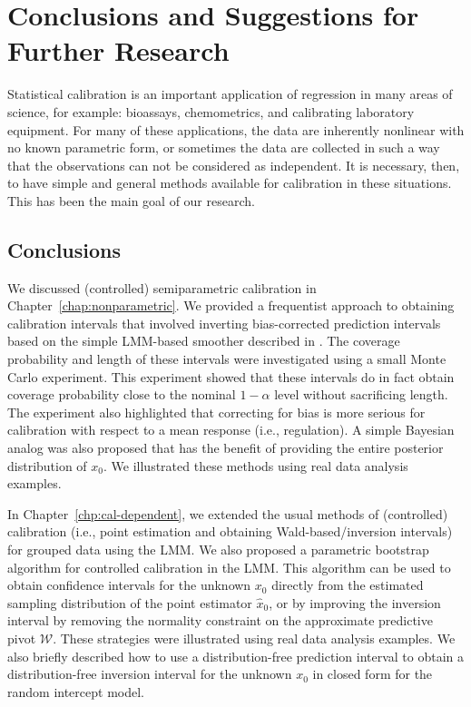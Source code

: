 \documentclass[cmfont,usenames,dvipsnames,leqno]{afit-etd}\usepackage[]{graphicx}\usepackage[]{color}
\begin{document}


\chapter{Conclusions and Suggestions for Further Research}
\label{chp:conclusion}
Statistical calibration is an important application of regression in many areas of science, for example: bioassays, chemometrics, and calibrating laboratory equipment. For many of these applications, the data are inherently nonlinear with no known parametric form, or sometimes the data are collected in such a way that the observations can not be considered as independent. It is necessary, then, to have simple and general methods available for calibration in these situations. This has been the main goal of our research.

\section{Conclusions}
We discussed (controlled) semiparametric calibration in Chapter~\ref{chap:nonparametric}. We provided a frequentist approach to obtaining calibration intervals that involved inverting bias-corrected prediction intervals based on the simple LMM-based smoother described in \citet{ruppert_semiparametric_2003}. The coverage probability and length of these intervals were investigated using a small Monte Carlo experiment. This experiment showed that these intervals do in fact obtain coverage probability close to the nominal $1-\alpha$ level without sacrificing length. The experiment also highlighted that correcting for bias is more serious for calibration with respect to a mean response (i.e., regulation). A simple Bayesian analog was also proposed that has the benefit of providing the entire posterior distribution of $x_0$. We illustrated these methods using real data analysis examples.

In Chapter~\ref{chp:cal-dependent}, we extended the usual methods of (controlled) calibration (i.e., point estimation and obtaining Wald-based/inversion intervals) for grouped data using the LMM. We also proposed a parametric bootstrap algorithm for controlled calibration in the LMM. This algorithm can be used to obtain confidence intervals for the unknown $x_0$ directly from the estimated sampling distribution of the point estimator $\widehat{x}_0$, or by improving the inversion interval by removing the normality constraint on the approximate predictive pivot $\mathcal{W}$. These strategies were illustrated using real data analysis examples. We also briefly described how to use a distribution-free prediction interval to obtain a distribution-free inversion interval for the unknown $x_0$ in closed form for the random intercept model.
\end{document}
